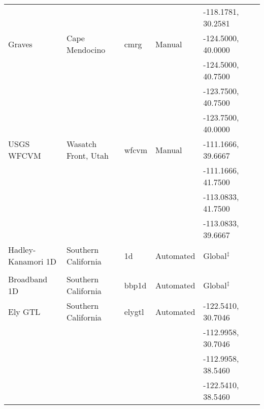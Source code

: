 \begin{table*}
\begin{tabular}[]{llllll}
                   &                       &               &              & -118.1781, 30.2581 &                              \\
Graves             & Cape Mendocino        & cmrg          &  Manual      & -124.5000, 40.0000 & \citet{Graves_1994_SSA}      \\
                   &                       &               &              & -124.5000, 40.7500 &                              \\
                   &                       &               &              & -123.7500, 40.7500 &                              \\
                   &                       &               &              & -123.7500, 40.0000 &                              \\
USGS WFCVM         & Wasatch Front, Utah   & wfcvm         &  Manual      & -111.1666, 39.6667 & \citet{Magistrale_2006_Tech} \\
                   &                       &               &              & -111.1666, 41.7500 &                              \\
                   &                       &               &              & -113.0833, 41.7500 &                              \\
                   &                       &               &              & -113.0833, 39.6667 &                              \\
Hadley-Kanamori 1D & Southern California   & 1d            &  Automated   & Global$^\ddagger$  & \citet{Kanamori_1975_Chap}   \\
                   &                       &               &              &                    & \citet{Hadley_1977_GSAB}     \\
Broadband 1D       & Southern California   & bbp1d         &  Automated   & Global$^\ddagger$  & \citet{Graves_2010_BSSA}     \\
Ely GTL            & Southern California   & elygtl        &  Automated   & -122.5410, 30.7046 & \citet{Ely_2010_AGU}         \\
                   &                       &               &              & -112.9958, 30.7046 &                              \\
                   &                       &               &              & -112.9958, 38.5460 &                              \\
                   &                       &               &              & -122.5410, 38.5460 &                              \\

\end{tabular}
\end{table*}
